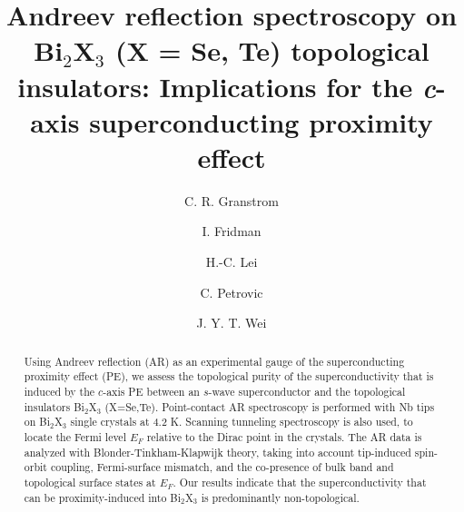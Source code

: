 \documentclass[aps,prl,twocolumn,showpacs,amsmath,amssymb,superscriptaddress,citeautoscript]{revtex4-1}
\begin{document}
\title{Andreev reflection spectroscopy on Bi$_{2}$X$_{3}$ (X = Se, Te) topological insulators: Implications for the \textit{c}-axis superconducting proximity effect}

\author{C. R. Granstrom}

\author{I. Fridman}

\author{H.-C. Lei}

\author{C. Petrovic}

\author{J. Y. T. Wei}





\begin{abstract}

Using Andreev reflection (AR) as an experimental gauge of the superconducting proximity effect (PE), we assess the topological purity of the superconductivity that is induced by the $c$-axis PE between an $s$-wave superconductor and the topological insulators Bi$_{2}$X$_{3}$ (X=Se,Te).  Point-contact AR spectroscopy is performed with Nb tips on Bi$_{2}$X$_{3}$ single crystals at 4.2 K.  Scanning tunneling spectroscopy is also used, to locate the Fermi level $E_F$ relative to the Dirac point in the crystals. The AR data is analyzed with Blonder-Tinkham-Klapwijk theory, taking into account tip-induced spin-orbit coupling, Fermi-surface mismatch, and the co-presence of bulk band and topological surface states at $E_F$. Our results indicate that the superconductivity that can be proximity-induced into Bi$_{2}$X$_{3}$ is predominantly non-topological.
\end{abstract}
\end{document}
